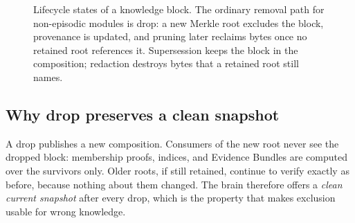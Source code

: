 \documentclass[11pt,a4paper]{article}
\begin{document}
\begin{figure}[t]
\centering
{}
\caption{Lifecycle states of a knowledge block. The ordinary removal path for
non-episodic modules is drop: a new Merkle root excludes the block, provenance
is updated, and pruning later reclaims bytes once no retained root references
it. Supersession keeps the block in the composition; redaction destroys bytes
that a retained root still names.}
\label{fig:lifecycle-states}
\end{figure}

\subsection{Why drop preserves a clean snapshot}
\label{sec:erasure-verifiability}

A drop publishes a new composition. Consumers of the new root never see the
dropped block: membership proofs, indices, and Evidence Bundles are computed
over the survivors only. Older roots, if still retained, continue to verify
exactly as before, because nothing about them changed. The brain therefore
offers a \emph{clean current snapshot} after every drop, which is the property
that makes exclusion usable for wrong knowledge.
\end{document}
